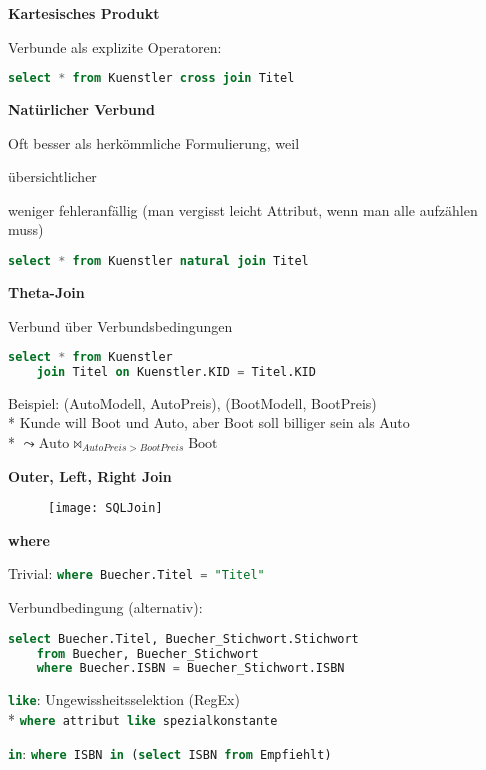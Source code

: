 \textbf{Kartesisches Produkt}
\begin{items}
	\item Verbunde als explizite Operatoren:
		\begin{lstlisting}[language=sql]
select * from Kuenstler cross join Titel
		\end{lstlisting}
\end{items}

\textbf{Natürlicher Verbund}
\begin{items}
	\item Oft besser als herkömmliche Formulierung, weil
	\begin{enumeration}
		\item übersichtlicher
		\item weniger fehleranfällig (man vergisst leicht Attribut, wenn man alle aufzählen muss)
	\end{enumeration}
	\item
	\begin{lstlisting}[language=sql]
select * from Kuenstler natural join Titel
	\end{lstlisting}
\end{items}

\textbf{Theta-Join}
\begin{items}
	\item Verbund über Verbundsbedingungen
	\begin{lstlisting}[language=sql]
select * from Kuenstler 
	join Titel on Kuenstler.KID = Titel.KID
	\end{lstlisting}
	\item Beispiel: (AutoModell, AutoPreis), (BootModell, BootPreis) \\*
	Kunde will Boot und Auto, aber Boot soll billiger sein als Auto \\*
	\( \leadsto \text{Auto} \bowtie_{AutoPreis > BootPreis} \text{Boot} \)
\end{items}

\textbf{Outer, Left, Right Join}
\begin{figure}[H]\centering\label{SQLJoin}\texttt{[image: SQLJoin]}\end{figure}

\newpage

\textbf{where}
\begin{items}
	\item Trivial: \lstinline[language=sql]{where Buecher.Titel = "Titel"}
	\item Verbundbedingung (alternativ):
	\begin{lstlisting}[language=sql]
select Buecher.Titel, Buecher_Stichwort.Stichwort
	from Buecher, Buecher_Stichwort
	where Buecher.ISBN = Buecher_Stichwort.ISBN
	\end{lstlisting}
	\item \lstinline[language=sql]{like}: Ungewissheitsselektion (RegEx) \\*
	\lstinline[language=sql]{where attribut like spezialkonstante}
	\item \lstinline[language=sql]{in}: \lstinline[language=sql]{where ISBN in (select ISBN from Empfiehlt)}
\end{items}

